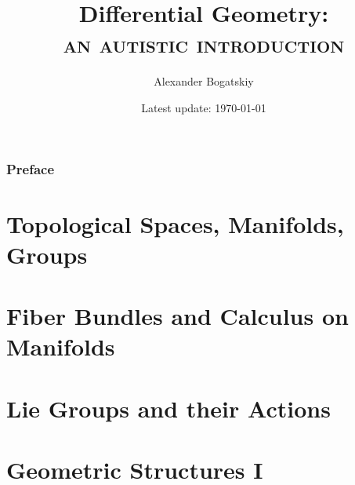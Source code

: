 \documentclass[english,a5paper]{book}%
\begin{document}
\title{
    {\Large{}Differential Geometry:}\\
    \textsc{an autistic introduction}
    }
\author{Alexander Bogatskiy}
\date{Latest update: \today}

\maketitle

\tableofcontents{}

\clearpage
\printglossary[type=\acronymtype,title=Abbreviations,style=long,nonumberlist] %


\clearpage
\section*{Preface}



\part{Topological Spaces, Manifolds, Groups}



\clearpage
\part{Fiber Bundles and Calculus on Manifolds}



\clearpage
\part{Lie Groups and their Actions}



\clearpage
\part{Geometric Structures I}\label{Part Structured Geom I}



% 


% 
\end{document}
